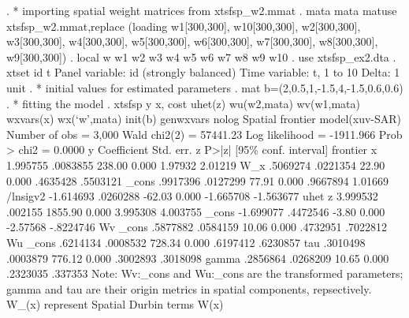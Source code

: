 . * importing spatial weight matrices from xtsfsp_w2.mmat
. mata mata matuse xtsfsp_w2.mmat,replace
(loading w1[300,300], w10[300,300], w2[300,300], w3[300,300], w4[300,300], w5[300,300], w6[300,300], w7[300,300], w8[300,300], w9[300,300])
{\smallskip}
. local w w1 w2 w3 w4 w5 w6 w7 w8 w9 w10
{\smallskip}
. use xtsfsp_ex2.dta
{\smallskip}
. xtset id t 
{\smallskip}
Panel variable: id (strongly balanced)
 Time variable: t, 1 to 10
         Delta: 1 unit
{\smallskip}
. * initial values for estimated parameters
. mat b=(2,0.5,1,-1.5,4,-1.5,0.6,0.6)
{\smallskip}
. * fitting the model
. xtsfsp y x, cost uhet(z) wu(w2,mata) wv(w1,mata) wxvars(x) wx(`w',mata) init(b) genwxvars nolog
{\smallskip}
Spatial frontier model(xuv-SAR)                       Number of obs =    3,000
                                                      Wald chi2(2)  = 57441.23
Log likelihood = -1911.966                            Prob > chi2   =   0.0000
{\smallskip}
           y {\VBAR} Coefficient  Std. err.      z    P>|z|     [95\% conf. interval]
frontier     {\VBAR}
           x {\VBAR}   1.995755   .0083855   238.00   0.000      1.97932     2.01219
         W_x {\VBAR}   .5069274   .0221354    22.90   0.000     .4635428    .5503121
       _cons {\VBAR}   .9917396   .0127299    77.91   0.000     .9667894     1.01669
    /lnsigv2 {\VBAR}  -1.614693   .0260288   -62.03   0.000    -1.665708   -1.563677
uhet         {\VBAR}
           z {\VBAR}   3.999532    .002155  1855.90   0.000     3.995308    4.003755
       _cons {\VBAR}  -1.699077   .4472546    -3.80   0.000     -2.57568   -.8224746
Wv           {\VBAR}
       _cons {\VBAR}   .5877882   .0584159    10.06   0.000     .4732951    .7022812
Wu           {\VBAR}
       _cons {\VBAR}   .6214134   .0008532   728.34   0.000     .6197412    .6230857
         tau {\VBAR}   .3010498   .0003879   776.12   0.000     .3002893    .3018098
       gamma {\VBAR}   .2856864   .0268209    10.65   0.000     .2323035     .337353
Note: Wv:_cons and Wu:_cons are the transformed parameters;
      gamma and tau are their origin metrics in spatial components, repsectively.
      W_(x) represent Spatial Durbin terms W(x)
